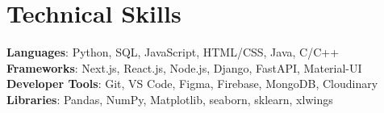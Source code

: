 \documentclass[letterpaper,11pt]{article}
\begin{document}
%
\section{Technical Skills}
 \begin{itemize}[leftmargin=0.15in, label={}]
    \small{\item{
     \textbf{Languages}{: Python, SQL, JavaScript, HTML/CSS, Java, C/C++} \\
     \textbf{Frameworks}{: Next.js, React.js, Node.js, Django, FastAPI, Material-UI} \\
     \textbf{Developer Tools}{: Git, VS Code, Figma, Firebase, MongoDB, Cloudinary} \\
     \textbf{Libraries}{: Pandas, NumPy, Matplotlib, seaborn, sklearn, xlwings}
    }}
 \end{itemize}


\end{document}
